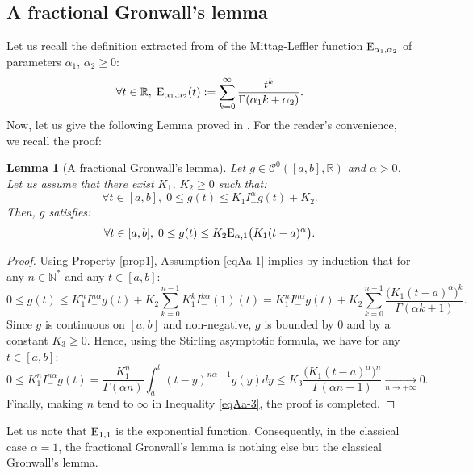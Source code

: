 \documentclass[english,11pt,reqno]{smfart}
\newtheorem{lemma}[theorem]{Lemma}
\def\di{\displaystyle}
\newcommand{\N}{\mathbb{N}}
\newcommand{\R}{\mathbb{R}}
\newcommand{\CC}{\mathscr{C}}
\begin{document}
\subsection{A fractional Gronwall's lemma}\label{appAa}
Let us recall the definition extracted from \cite{kilb,podl,samk} of the Mittag-Leffler function ${\rm E}_{\alpha_1,\alpha_2}$ of parameters $\alpha_1$, $\alpha_2 \geq 0$:
\begin{equation}
\forall t \in \R, \; {\rm E}_{\alpha_1,\alpha_2} (t) := \di \sum_{k=0}^{\infty} \dfrac{t^k}{\Gamma (\alpha_1 k + \alpha_2)}.
\end{equation}
Now, let us give the following Lemma proved in \cite{diet,gao}. For the reader's convenience, we recall the proof:
\begin{lemma}[A fractional Gronwall's lemma]\label{lemgronf}
Let $g \in \CC^0 ([a,b],\R)$ and $\alpha >0$. Let us assume that there exist $K_1$, $K_2 \geq 0 $ such that:
\begin{equation}\label{eqAa-1}
\forall t \in [a,b], \; 0 \leq g(t) \leq K_1 I^\alpha_- g(t) + K_2.
\end{equation}
Then, $g$ satisfies:
\begin{equation}\label{eqAa-2}
\forall t \in [a,b],\;  0 \leq g(t) \leq K_2 {\rm E}_{\alpha,1} \big( K_1 (t-a)^\alpha \big).
\end{equation}
\end{lemma}

\begin{proof}
Using Property \ref{prop1}, Assumption \eqref{eqAa-1} implies by induction that for any $n \in \N^*$ and any $t \in [a,b]$:
\begin{equation}\label{eqAa-3}
0 \leq g(t) \leq K_1^n  I^{n \alpha}_- g(t) + K_2 \di \sum_{k=0}^{n-1} K_1^k I^{k\alpha}_- (1) (t) = K_1^n  I^{n \alpha}_- g(t) + K_2 \di \sum_{k=0}^{n-1} \dfrac{\big( K_1(t-a)^{\alpha}\big)^k}{\Gamma (\alpha k+1)}.
\end{equation}
Since $g$ is continuous on $[a,b]$ and non-negative, $g$ is bounded by $0$ and by a constant $K_3 \geq 0$. Hence, using the Stirling asymptotic formula, we have for any $t \in [a,b]$:
\begin{equation}
0 \leq K_1^n I^{n \alpha}_- g(t) = \dfrac{K_1^n}{\Gamma (\alpha n)} \di \int_a^t (t-y)^{n\alpha-1} g(y) dy  \leq  K_3 \dfrac{\big( K_1 (t-a)^{\alpha} \big)^n}{\Gamma (\alpha n+1)} \underset{n\to+\infty}{\longrightarrow}  0.
\end{equation}
Finally, making $n$ tend to $\infty$ in Inequality \eqref{eqAa-3}, the proof is completed.
\end{proof}
Let us note that ${\rm E}_{1,1}$ is the exponential function. Consequently, in the classical case $\alpha =1$, the fractional Gronwall's lemma is nothing else but the classical Gronwall's lemma.
\end{document}
